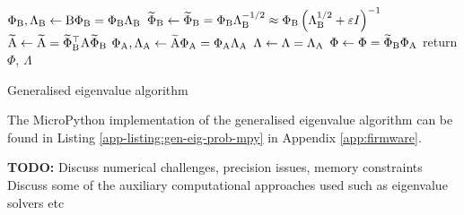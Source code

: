 \begin{algorithm}
\begin{algorithmic}
\State $\Phi_{{\textrm{B}}}, \Lambda_{{\textrm{B}}} \gets {\textrm{B}} \Phi_{{\textrm{B}}}=\Phi_{{\textrm{B}}} \Lambda_{{\textrm{B}}}$ 
\State $\widetilde{\Phi}_{{\textrm{B}}} \gets \widetilde{\Phi}_{{\textrm{B}}}=\Phi_{{\textrm{B}}} \Lambda_{{\textrm{B}}}^{-1 / 2} \approx \Phi_{{\textrm{B}}}\left(\Lambda_{{\textrm{B}}}^{1 / 2}+\varepsilon I\right)^{-1}$ 
\State $\widetilde{{\textrm{A}}} \gets \widetilde{{\textrm{A}}}=\widetilde{\Phi}_{{\textrm{B}}}^{\top} {\textrm{A}} \widetilde{\Phi}_{{\textrm{B}}}$ 
\State $\Phi_{{\textrm{A}}}, \Lambda_{{\textrm{A}}} \gets \widetilde{{\textrm{A}}} \Phi_{{\textrm{A}}}=\Phi_{{\textrm{A}}} \Lambda_{{\textrm{A}}}$ 
\State $\Lambda \gets \Lambda=\Lambda_{{\textrm{A}}}$ 
\State $\Phi \gets \Phi=\widetilde{\Phi}_{{\textrm{B}}} \Phi_{{\textrm{A}}}$ 
\State return $\Phi$, $\Lambda$ 
\end{algorithmic}
\caption{Generalised eigenvalue algorithm}
\label{alg:gen-eig-algo}
\end{algorithm}

The MicroPython implementation of the generalised eigenvalue algorithm can be found in Listing \ref{app-listing:gen-eig-prob-mpy} in Appendix \ref{app:firmware}.

\textbf{TODO:} Discuss numerical challenges, precision issues, memory constraints
Discuss some of the auxiliary computational approaches used such as eigenvalue solvers etc

